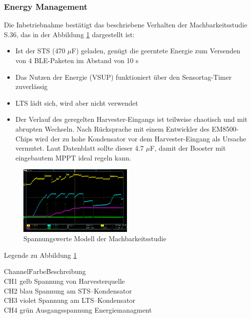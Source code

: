\subsubsection{Energy Management}
Die Inbetriebnahme bestätigt das beschriebene Verhalten der Machbarkeitsstudie \cite{PA_bicycle} S.36, das in der Abbildung \ref{spannungMachbarkeit} dargestellt ist:
\begin{itemize}
 \item Ist der STS (470 $\mu$F) geladen, genügt die geerntete Energie zum Versenden von 4 BLE-Paketen im Abstand von 10 s
 \item Das Nutzen der Energie (VSUP) funktioniert über den Sensortag-Timer zuverlässig 
 \item LTS lädt sich, wird aber nicht verwendet 
 \item Der Verlauf des geregelten Harvester-Eingangs ist teilweise chaotisch und mit abrupten Wechseln. Nach Rücksprache mit einem Entwickler des EM8500-Chips wird der zu hohe Kondensator vor dem Harvester-Eingang als Ursache vermutet. Laut Datenblatt sollte dieser 4.7 $\mu$F, damit der Booster mit eingebautem MPPT ideal regeln kann.
\end{itemize} 

\begin{figure}[ht]
    \includegraphics[width=0.5\textwidth]{3Vorgehen/imag/messungPA.png}
    \caption{Spannungswerte Modell der Machbarkeitsstudie}\label{spannungMachbarkeit} 
\end{figure}

Legende zu Abbildung \ref{spannungMachbarkeit}
\begin{tabbing}
    Channel\quad\= Farbe\quad\= Beschreibung\\[0.8ex]
    CH1\> gelb\> Spannung von Harvesterquelle\\
    CH2\> blau\> Spannung am STS--Kondensator\\
    CH3\> violet\> Spannung am LTS--Kondensator\\
    CH4\> grün\> Ausgangsspannung Energiemanagment\\
\end{tabbing}

